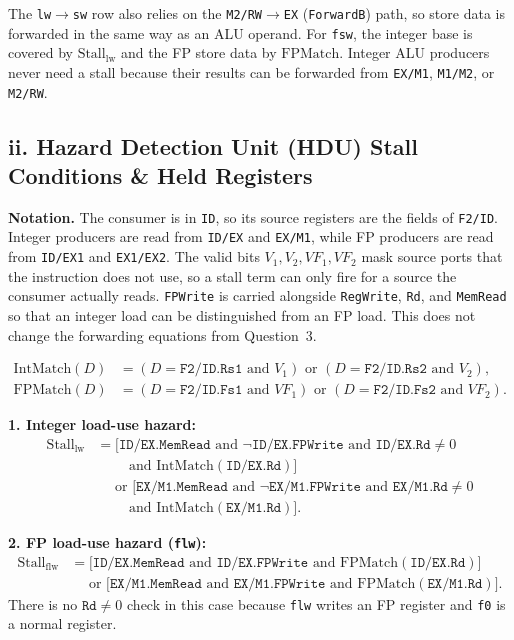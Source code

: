 \documentclass[11pt, a4paper]{article}
\begin{document}
The \texttt{lw}$\rightarrow$\texttt{sw} row also relies on the \texttt{M2/RW}$\rightarrow$\texttt{EX} (\texttt{ForwardB}) path, so store data is forwarded in the same way as an ALU operand. For \texttt{fsw}, the integer base is covered by $\text{Stall}_{\text{lw}}$ and the FP store data by $\text{FPMatch}$. Integer ALU producers never need a stall because their results can be forwarded from \texttt{EX/M1}, \texttt{M1/M2}, or \texttt{M2/RW}.

\subsection*{ii. Hazard Detection Unit (HDU) Stall Conditions \& Held Registers}

\textbf{Notation.} The consumer is in \texttt{ID}, so its source registers are the fields of \texttt{F2/ID}. Integer producers are read from \texttt{ID/EX} and \texttt{EX/M1}, while FP producers are read from \texttt{ID/EX1} and \texttt{EX1/EX2}. The valid bits $V_1,V_2,VF_1,VF_2$ mask source ports that the instruction does not use, so a stall term can only fire for a source the consumer actually reads. \texttt{FPWrite} is carried alongside \texttt{RegWrite}, \texttt{Rd}, and \texttt{MemRead} so that an integer load can be distinguished from an FP load. This does not change the forwarding equations from Question~3.

\begin{align*}
\text{IntMatch}(D) &= (D=\texttt{F2/ID.Rs1}\text{ and } V_1)\text{ or }(D=\texttt{F2/ID.Rs2}\text{ and } V_2),\\
\text{FPMatch}(D) &= (D=\texttt{F2/ID.Fs1}\text{ and } VF_1)\text{ or }(D=\texttt{F2/ID.Fs2}\text{ and } VF_2).
\end{align*}

\textbf{1. Integer load-use hazard:}
\begin{align*}
\text{Stall}_{\text{lw}} &=
\big[\texttt{ID/EX.MemRead}\text{ and }\neg\texttt{ID/EX.FPWrite}
\text{ and }\texttt{ID/EX.Rd}\neq0\\
&\qquad\text{ and }\text{IntMatch}(\texttt{ID/EX.Rd})\big]\\
&\quad\text{ or }\big[\texttt{EX/M1.MemRead}\text{ and }\neg\texttt{EX/M1.FPWrite}
\text{ and }\texttt{EX/M1.Rd}\neq0\\
&\qquad\text{ and }\text{IntMatch}(\texttt{EX/M1.Rd})\big].
\end{align*}

\textbf{2. FP load-use hazard (\texttt{flw}):}
\begin{align*}
\text{Stall}_{\text{flw}} &=
\big[\texttt{ID/EX.MemRead}\text{ and }\texttt{ID/EX.FPWrite}
\text{ and }\text{FPMatch}(\texttt{ID/EX.Rd})\big]\\
&\quad\text{ or }\big[\texttt{EX/M1.MemRead}\text{ and }\texttt{EX/M1.FPWrite}
\text{ and }\text{FPMatch}(\texttt{EX/M1.Rd})\big].
\end{align*}
There is no $\texttt{Rd}\neq0$ check in this case because \texttt{flw} writes an FP register and \texttt{f0} is a normal register.
\end{document}
